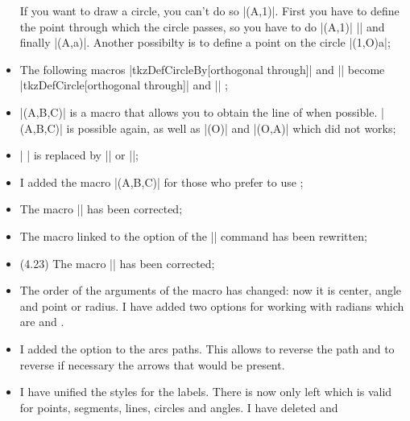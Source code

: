 \begin{itemize}
If you want to draw a circle, you can't do so |\tkzDrawCircle[R](A,1)|. First you have to define the point through which the circle passes, so you have to do 
|\tkzDefCircle[R](A,1)| || and finally |\tkzDrawCircle(A,a)|. Another possibilty is to define a point on the circle |\tkzDefShiftPoint[A](1,O){a}|;


\item The following macros  |tkzDefCircleBy[orthogonal through]| and || become |tkzDefCircle[orthogonal through]| and || ;


\item |\tkzDefLine[euler](A,B,C)| is a macro that allows you to obtain the line of  when possible. |\tkzDefLine[altitude](A,B,C)| is possible again, as well as |\tkzDefLine[tangent at=A](O)| and |\tkzDefLine[tangent from=P](O,A)| which did not works;


\item | \tkzDefTangent| is replaced by |\tkzDelLine[tangent from = ...]| or |\tkzDelLine[tangent at = ...]|;


\item I added the macro |(A,B,C)| for those who prefer to use  \TIKZ ;


\item The macro |\tkzMarkAngle| has been corrected;

\item The macro linked to the  option of the |\tkzDefCircle| command has been rewritten;

\item (4.23) The macro |\tkzDrawSemiCircle| has been corrected;

\item 
The order of the arguments of the macro  has changed: now it is center, angle and point or radius.
I have added two options for working with radians which are  and .


\item I added the option  to the arcs paths. This allows to reverse the path and to reverse if necessary the arrows that would be present.


\item I have unified the styles for the labels. There is now only  left which is valid for points, segments, lines, circles and angles. I have deleted   and 


\end{itemize}
